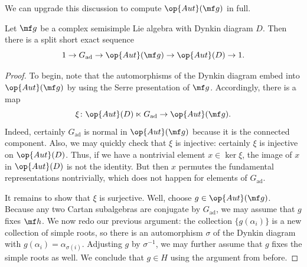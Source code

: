 \documentclass[../notes.tex]{subfiles}
\begin{document}
We can upgrade this discussion to compute $\op{Aut}(\mf g)$ in full.
\begin{proposition} \label{prop:aut-lie-alg}
	Let $\mf g$ be a complex semisimple Lie algebra with Dynkin diagram $D$. Then there is a split short exact sequence
	\[1\to G_{\mathrm{ad}}\to\op{Aut}(\mf g)\to\op{Aut}(D)\to1.\]
\end{proposition}
\begin{proof}
	To begin, note that the automorphisms of the Dynkin diagram embed into $\op{Aut}(\mf g)$ by using the Serre presentation of $\mf g$. Accordingly, there is a map
	\[\xi\colon\op{Aut}(D)\ltimes G_{\mathrm{ad}}\to\op{Aut}(\mf g).\]
	Indeed, certainly $G_{\mathrm{ad}}$ is normal in $\op{Aut}(\mf g)$ because it is the connected component. Also, we may quickly check that $\xi$ is injective: certainly $\xi$ is injective on $\op{Aut}(D)$. Thus, if we have a nontrivial element $x\in\ker\xi$, the image of $x$ in $\op{Aut}(D)$ is not the identity. But then $x$ permutes the fundamental representations nontrivially, which does not happen for elements of $G_{\mathrm{ad}}$.

	It remains to show that $\xi$ is surjective. Well, choose $g\in\op{Aut}(\mf g)$. Because any two Cartan subalgebras are conjugate by $G_{\mathrm{ad}}$, we may assume that $g$ fixes $\mf h$. We now redo our previous argument: the collection $\{g(\alpha_i)\}$ is a new collection of simple roots, so there is an automorphism $\sigma$ of the Dynkin diagram with $g(\alpha_i)=\alpha_{\sigma(i)}$. Adjusting $g$ by $\sigma^{-1}$, we may further assume that $g$ fixes the simple roots as well. We conclude that $g\in H$ using the argument from before.
\end{proof}
\end{document}

